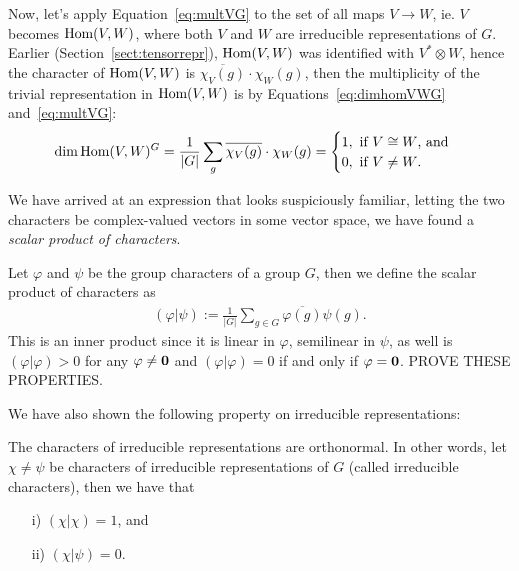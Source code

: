 Now, let's apply Equation~\ref{eq:multVG} to the set of all maps $V \rightarrow W$, ie. $V$ becomes $\text{Hom} (V,W)$, where both $V$ and $W$ are irreducible representations of $G$. Earlier (Section~\ref{sect:tensorrepr}), $\text{Hom}(V,W)$ was identified with $V^* \otimes W$, hence the character of $\text{Hom}(V,W)$ is $\overline{\chi_V(g)}\cdot\chi_W(g)$, then the multiplicity of the trivial representation in $\text{Hom}(V,W)$ is by Equations~\ref{eq:dimhomVWG} and~\ref{eq:multVG}:
\begin{align*}
	\dim \text{Hom}(V,W)^G = \frac{1}{|G|} \sum_g \overline{\chi_V(g)}\cdot\chi_W(g) = \begin{cases}
		1, \text{ if $V \cong W$, and} \\
		0, \text{ if $V \neq W$.}
	\end{cases}
\end{align*}

We have arrived at an expression that looks suspiciously familiar, letting the two characters be complex-valued vectors in some vector space, we have found a \textit{scalar product of characters}.

\begin{definition}
	Let $\varphi$ and $\psi$ be the group characters of a group $G$, then we define the scalar product of characters as
	\begin{align*}
		(\varphi | \psi) := \frac{1}{|G|} \sum_{g \in G} \overline{\varphi(g)} {\psi(g)}.
	\end{align*}
	This is an inner product since it is linear in $\varphi$, semilinear in $\psi$, as well is $(\varphi|\varphi) > 0 $ for any $\varphi \neq \mathbf{0}$ and $(\varphi|\varphi)=0$ if and only if $\varphi= \mathbf{0}$. PROVE THESE PROPERTIES.
\end{definition}


We have also shown the following property on irreducible representations:

\begin{theorem}\label{thm:irredcrit}
	The characters of irreducible representations are orthonormal. In other words, let $\chi \neq \psi$ be characters of irreducible representations of $G$ (called irreducible characters), then we have that 
	\begin{enumerate}
		\item[i)] $(\chi|\chi)= 1$, and
		\item[ii)] $(\chi|\psi) = 0$.
	\end{enumerate}
\end{theorem}

